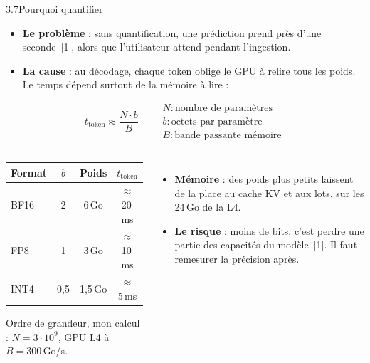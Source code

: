 \documentclass[11pt,aspectratio=169]{beamer}
\newcommand{\refs}[1]{{\color{mlblue}[#1]}}
\newcommand{\remarque}[1]{{\footnotesize\color{mlgray}#1\par}}
\begin{document}
\begin{frame}{3.7\quad Pourquoi quantifier}
  \small
  \begin{itemize}
    \item \textbf{Le problème} : sans quantification, une prédiction prend près d'une
      seconde~\refs{1}, alors que l'utilisateur attend pendant l'ingestion.
    \item \textbf{La cause} : au décodage, chaque token oblige le GPU à relire tous les
      poids. Le temps dépend surtout de la mémoire à lire :
  \end{itemize}
  \[
    t_{\text{token}} \approx \frac{N \cdot b}{B} \qquad
    \begin{array}{l}
      N : \text{nombre de paramètres} \\
      b : \text{octets par paramètre} \\
      B : \text{bande passante mémoire}
    \end{array}
  \]

  \begin{columns}[T]
    \begin{center}
      \renewcommand{\arraystretch}{1.15}
      \begin{tabular}{@{}lccc@{}}
        \toprule
        Format & $b$ & Poids & $t_{\text{token}}$ \\
        \midrule
        BF16 & 2 & 6\,Go & $\approx$ 20\,ms \\
        FP8 & 1 & 3\,Go & $\approx$ 10\,ms \\
        INT4 & 0,5 & 1,5\,Go & $\approx$ 5\,ms \\
        \bottomrule
      \end{tabular}

      \remarque{Ordre de grandeur, mon calcul : $N = 3 \cdot 10^9$, GPU L4 à
      $B = 300$\,Go/s.}
    \end{center}
    \begin{itemize}
      \item \textbf{Mémoire} : des poids plus petits laissent de la place au cache KV et aux
        lots, sur les 24\,Go de la L4.
      \item \textbf{Le risque} : moins de bits, c'est perdre une partie des capacités du
        modèle~\refs{1}. Il faut remesurer la précision après.
    \end{itemize}
  \end{columns}
\end{frame}
\end{document}
